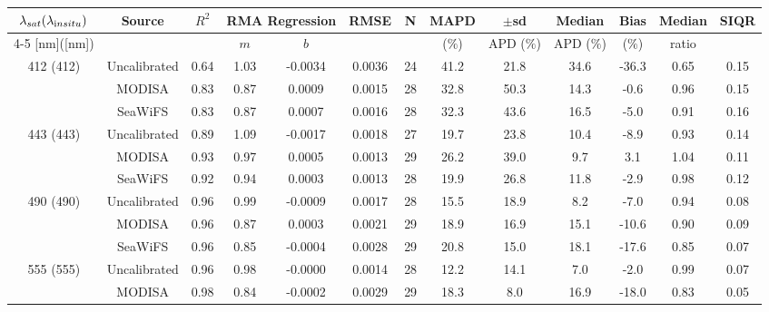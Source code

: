 \documentclass[preview]{standalone}
\begin{document}
\tiny

\tiny
\centering
\begin{tabular}{ccccccccccccc} 
 \hline 
$\lambda_{sat} (\lambda_{\text in situ})$ & Source & $R^2$ & \multicolumn{2}{c}{RMA Regression} & RMSE & N & MAPD & $\pm$sd & Median & Bias & Median & SIQR \\ \cline{4-5}
[nm]([nm])                  &              &         & $m$     & $b$     &             &     & ($\%$)  & APD ($\%$)  & APD ($\%$)  & ($\%$)   & ratio   &         \\ \hline 
 \hline  
\multirow{3}{*}{412 (412)} 	& Uncalibrated 	& 0.64 & 1.03 & -0.0034 & 0.0036 & 24 & 41.2 & 21.8 & 34.6 & -36.3 & 0.65 & 0.15 \\ 
							& MODISA 		& 0.83 & 0.87 & 0.0009 & 0.0015 & 28 & 32.8 & 50.3 & 14.3 & -0.6 & 0.96 & 0.15\\ 
							& SeaWiFS 		& 0.83 & 0.87 & 0.0007 & 0.0016 & 28 & 32.3 & 43.6 & 16.5 & -5.0 & 0.91 & 0.16 \\ \hline
\multirow{3}{*}{443 (443)} 	& Uncalibrated 	& 0.89 & 1.09 & -0.0017 & 0.0018 & 27 & 19.7 & 23.8 & 10.4 & -8.9 & 0.93 & 0.14  \\ 
 							& MODISA 		& 0.93 & 0.97 & 0.0005 & 0.0013 & 29 & 26.2 & 39.0 & 9.7 & 3.1 & 1.04 & 0.11 \\ 
 							& SeaWiFS 		& 0.92 & 0.94 & 0.0003 & 0.0013 & 28 & 19.9 & 26.8 & 11.8 & -2.9 & 0.98 & 0.12 \\ \hline
\multirow{3}{*}{490 (490)} 	& Uncalibrated 	& 0.96 & 0.99 & -0.0009 & 0.0017 & 28 & 15.5 & 18.9 & 8.2 & -7.0 & 0.94 & 0.08 \\ 
 							& MODISA 		& 0.96 & 0.87 & 0.0003 & 0.0021 & 29 & 18.9 & 16.9 & 15.1 & -10.6 & 0.90 & 0.09 \\ 
 							& SeaWiFS 		& 0.96 & 0.85 & -0.0004 & 0.0028 & 29 & 20.8 & 15.0 & 18.1 & -17.6 & 0.85 & 0.07  \\ \hline
\multirow{3}{*}{555 (555)} 	& Uncalibrated 	& 0.96 & 0.98 & -0.0000 & 0.0014 & 28 & 12.2 & 14.1 & 7.0 & -2.0 & 0.99 & 0.07 \\ 
 							& MODISA 		& 0.98 & 0.84 & -0.0002 & 0.0029 & 29 & 18.3 & 8.0 & 16.9 & -18.0 & 0.83 & 0.05 \\ 

\end{tabular}
\end{document}
